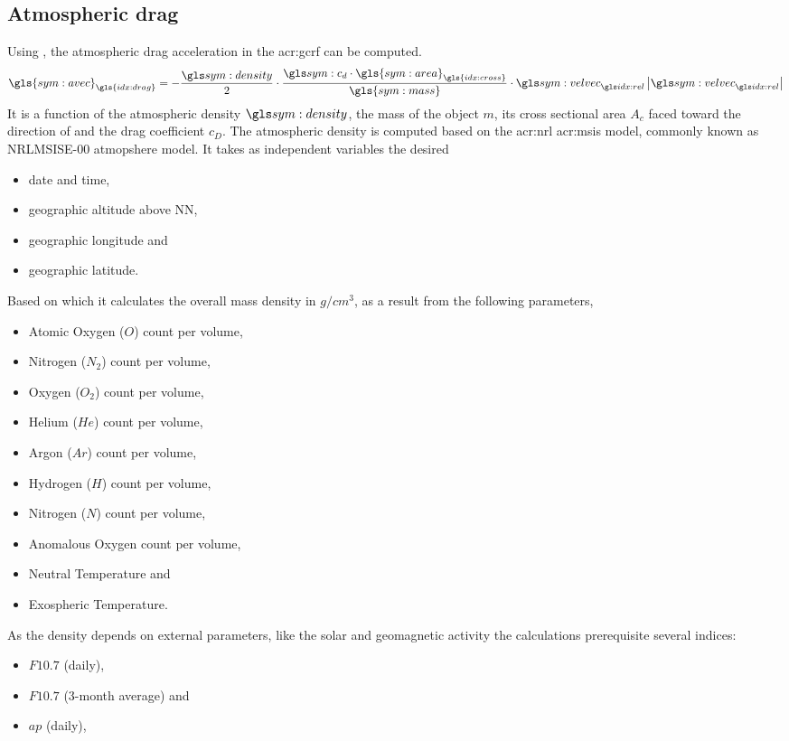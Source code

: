 \subsection{Atmospheric drag}
\label{sec:propagation-state-drag}
%
Using , the atmospheric drag acceleration in the \gls{acr:gcrf} can be computed.
\begin{equation}
 \label{eq:drag-acceleration}
 \gls{sym:avec}_{\gls{idx:drag}} = 
-\frac{\density}{2} \cdot \frac{\cd \cdot \gls{sym:area}_{\gls{idx:cross}}}{\gls{sym:mass}} \cdot \relvel\left|\relvel\right|
\end{equation}
It is a function of the atmospheric density $\density$, the mass of the object $m$, its cross sectional area $A_c$ faced toward the direction of \relvel and the drag coefficient $c_D$. The atmospheric density is computed based on the \gls{acr:nrl} \gls{acr:msis} model, commonly known as NRLMSISE-00 atmopshere model. It takes as independent variables the desired
\begin{itemize}
\item date and time,
\item geographic altitude above NN,
\item geographic longitude and
\item geographic latitude.
\end{itemize}
Based on which it calculates the overall mass density in $g/cm^3$, as a result from the following parameters,
\begin{itemize}
\item Atomic Oxygen ($O$) count per volume,
\item Nitrogen ($N_2$) count per volume,
\item Oxygen ($O_2$) count per volume,
\item Helium ($He$) count per volume,
\item Argon ($Ar$) count per volume,
\item Hydrogen ($H$) count per volume,
\item Nitrogen ($N$) count per volume,
\item Anomalous Oxygen count per volume,
\item Neutral Temperature and
\item Exospheric Temperature.
\end{itemize}
As the density depends on external parameters, like the solar and geomagnetic activity the calculations prerequisite several indices:
\begin{itemize}
\item $F10.7$ (daily),
\item $F10.7$ (3-month average) and
\item $ap$ (daily),
\end{itemize}
